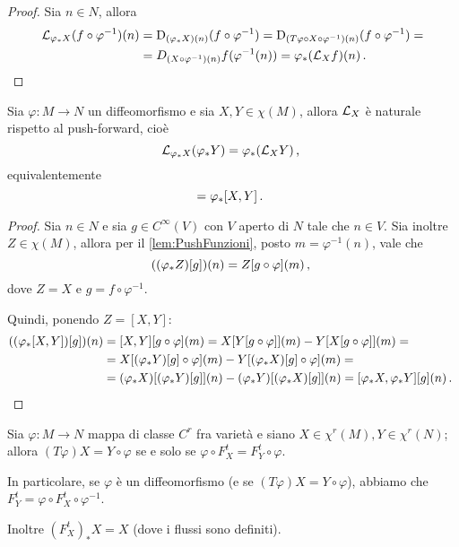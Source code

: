 \begin{proof}
	Sia $n\in N$, allora
	\begin{align*}
		\mathcal L_{\varphi_*X}(f\circ \varphi^{-1})(n)&=\mathrm D_{(\varphi_*X)(n)}(f\circ \varphi^{-1})=\mathrm D_{(T\varphi \circ X \circ\varphi^{-1})(n)}(f\circ \varphi^{-1})=\\
		&=D_{(X\circ \varphi^{-1})(n)} f(\varphi^{-1}(n))=\varphi_*(\mathcal L_Xf)(n)\, \text{. }
	\end{align*}
\end{proof}


\begin{proposition}
	Sia $\varphi:M\to N$ un diffeomorfismo e sia $X,Y\in\chi(M)$, allora $\mathcal L_X$ è naturale rispetto al push-forward, cioè
	\begin{equation*}
		\mathcal L_{\varphi_*X}(\varphi_*Y)=\varphi_*(\mathcal L_XY)\, \text{, }
	\end{equation*}
	equivalentemente
	\begin{equation*}
		[\varphi_*X,\varphi_*Y]=\varphi_*[X,Y]\punto
	\end{equation*}
\end{proposition}

\begin{proof}
	Sia $n\in N$ e sia $g\in C^\infty(V)$ con $V$ aperto di $N$ tale che $n\in V$. Sia inoltre $Z\in\chi(M)$, allora per il \cref{lem:PushFunzioni}, posto $m=\varphi^{-1}(n)$, vale che
	\begin{equation*}
		((\varphi_*Z)[g])(n)=Z[g\circ \varphi](m)\, \text{, }
	\end{equation*}
	dove $Z=X$ e $g=f\circ \varphi^{-1}$.
	
	Quindi, ponendo $Z=[X,Y]$:
	\begin{align*}
	((\varphi_*[X,Y])[g])(n)&=[X,Y][g\circ \varphi](m)=X[Y[g\circ \varphi]](m)-Y[X[g\circ \varphi]](m)=\\
	&=X[(\varphi_*Y)[g]\circ \varphi](m)-Y[(\varphi_*X)[g]\circ \varphi](m) =\\
	&= (\varphi_*X)[(\varphi_*Y)[g]](n)-(\varphi_*Y)[(\varphi_*X)[g]](n) = [\varphi_* X, \varphi_* Y][g](n)\, \text{. }
	\end{align*}
\end{proof}

\begin{lemma}
	Sia $\varphi:M\to N$ mappa di classe $C^r$ fra varietà e siano $X\in\chi^r(M),Y\in\chi^r(N)$; allora $(T\varphi)X=Y\circ \varphi$ se e solo se $\varphi\circ F_X^t=F_Y^t\circ\varphi$.
	
	In particolare, se $\varphi$ è un diffeomorfismo (e se $(T\varphi)X=Y\circ \varphi$), abbiamo che $F_Y^t=\varphi\circ F_X^t\circ \varphi^{-1}$.
	
	Inoltre $(F_X^t)_*X=X$ (dove i flussi sono definiti).
\end{lemma}

